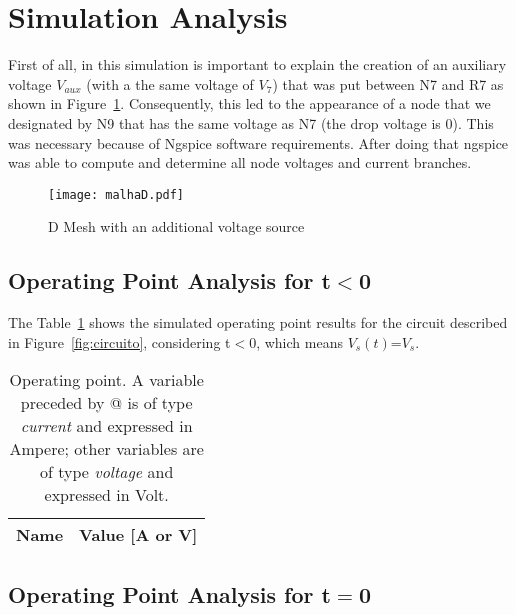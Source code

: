 \section{Simulation Analysis}

\label{sec:simulation}
First of all, in this simulation is important to explain the creation of an auxiliary voltage $V_{aux}$ (with a the same voltage of $V_{7}$) that was put between N7 and R7 as shown in Figure~\ref{fig:malhaD}. Consequently, this led to the appearance of a node that we designated by N9 that has the same voltage as N7 (the drop voltage is 0). This was necessary because of Ngspice software requirements. After doing that ngspice was able to compute and determine all node voltages and current branches.

\begin{figure}[!ht] \centering
\texttt{[image: malhaD.pdf]}
\caption{D Mesh with an additional voltage source} 
\label{fig:malhaD}
\end{figure}


\subsection{Operating Point Analysis for t$<$0}

The Table~\ref{tab:op1} shows the simulated operating point results for the circuit described in Figure~\ref{fig:circuito}, considering t$<$0, which means $V_{s}(t)$=$V_{s}$.

\begin{table}[!ht]
  \centering
  \begin{tabular}{|l|r|}
    \hline    
    {\bf Name} & {\bf Value [A or V]} \\ \hline
    
  \end{tabular}
  \caption{Operating point. A variable preceded by @ is of type {\em current}
    and expressed in Ampere; other variables are of type {\it voltage} and expressed in
    Volt.}
  \label{tab:op1}
\end{table}

\subsection{Operating Point Analysis for t$=$0}


